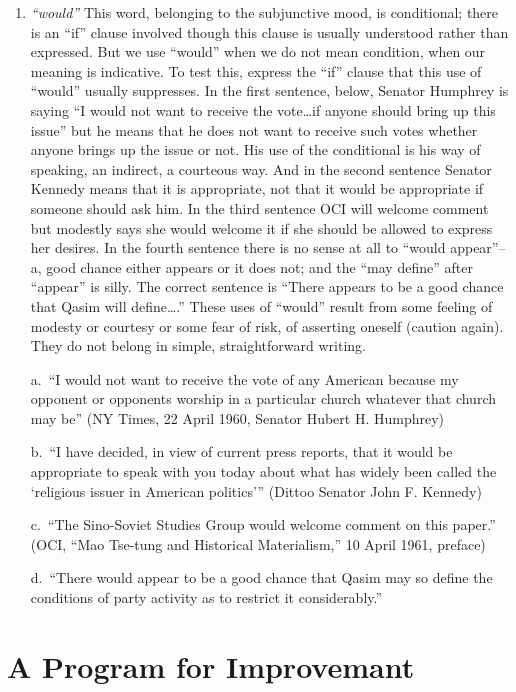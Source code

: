 \documentclass[
    oneside,
    11pt,
]{memoir}
\begin{document}
\begin{enumerate}
  \item \emph{\enquote{would}} This word, belonging to the subjunctive mood, is conditional; there is an \enquote{if} clause involved though this clause is usually understood rather than expressed. But we use \enquote{would} when we do not mean condition, when our meaning is indicative. To test this, express the \enquote{if} clause that this use of \enquote{would} usually suppresses. In the first sentence, below, Senator Humphrey is saying \enquote{I would not want to receive the vote\dots if anyone should bring up this issue} but he means that he does not want to receive such votes whether anyone brings up the issue or not. His use of the conditional is his way of speaking, an indirect, a courteous way. And in the second sentence Senator Kennedy means that it is appropriate, not that it would be appropriate if someone should ask him. In the third sentence OCI will welcome comment but modestly says she would welcome it if she should be allowed to express her desires. In the fourth sentence there is no sense at all to \enquote{would appear}-- a, good chance either appears or it does not; and the \enquote{may define} after \enquote{appear} is silly. The correct sentence is \enquote{There appears to be a good chance that Qasim will define\dots.} These uses of \enquote{would} result from some feeling of modesty or courtesy or some fear of risk, of asserting oneself (caution again). They do not belong in simple, straightforward writing. 
  
  a.\ \enquote{I would not want to receive the vote of any American because my opponent or opponents worship in a particular church whatever that church may be} (NY Times, 22 April 1960, Senator Hubert H. Humphrey) 
  
  b.\ \enquote{I have decided, in view of current press reports, that it would be appropriate to speak with you today about what has widely been called the \enquote{religious issuer in American politics}} (Dittoo Senator John F. Kennedy) 
  
  c.\ \enquote{The Sino-Soviet Studies Group would welcome comment on this paper.} (OCI, \enquote{Mao Tse-tung and Historical Materialism,} 10 April 1961, preface) 
  
  d.\ \enquote{There would appear to be a good chance that Qasim may so define the conditions of party activity as to restrict it considerably.}
\end{enumerate}
  
\chapter{A Program for Improvemant}
\end{document}
